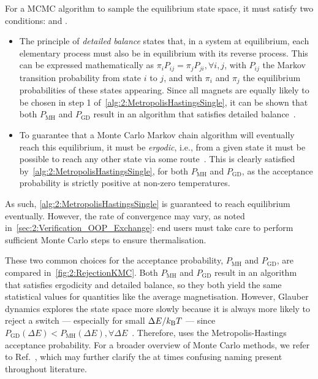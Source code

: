 For a MCMC algorithm to sample the equilibrium state space, it must satisfy two conditions:  and .
\begin{itemize}
	\item The principle of \textit{detailed balance} states that, in a system at equilibrium, each elementary process must also be in equilibrium with its reverse process.
	This can be expressed mathematically as $\pi_i P_{ij} = \pi_j P_{ji}, \forall i,j$, with $P_{ij}$ the Markov transition probability from state $i$ to $j$, and with $\pi_i$ and $\pi_j$ the equilibrium probabilities of these states appearing.
	Since all magnets are equally likely to be chosen in step 1 of~\cref{alg:2:MetropolisHastingsSingle}, it can be shown that both $P_\mathrm{MH}$ and $P_\mathrm{GD}$ result in an algorithm that satisfies detailed balance~\cite{kyimba2006comparisonIsingAlgorithms}.
	\item To guarantee that a Monte Carlo Markov chain algorithm will eventually reach this equilibrium, it must be \textit{ergodic}, i.e., from a given state it must be possible to reach any other state via some route~\cite{kyimba2006comparisonIsingAlgorithms}.
	This is clearly satisfied by~\cref{alg:2:MetropolisHastingsSingle}, for both $P_\mathrm{MH}$ and $P_\mathrm{GD}$, as the acceptance probability is strictly positive at non-zero temperatures.
\end{itemize}
As such, \cref{alg:2:MetropolisHastingsSingle} is guaranteed to reach equilibrium eventually.
However, the rate of convergence may vary, as noted in~\cref{sec:2:Verification_OOP_Exchange}: end users must take care to perform sufficient Monte Carlo steps to ensure thermalisation. %


These two common choices for the acceptance probability, $P_\mathrm{MH}$ and $P_\mathrm{GD}$, are compared in~\cref{fig:2:RejectionKMC}.
Both $P_\mathrm{MH}$ and $P_\mathrm{GD}$ result in an algorithm that satisfies ergodicity and detailed balance, so they both yield the same statistical values for quantities like the average magnetisation.
However, Glauber dynamics explores the state space more slowly because it is always more likely to reject a switch --- especially for small $\Delta E / \kBT$ --- since $P_\mathrm{GD}(\Delta E) < P_\mathrm{MH}(\Delta E), \forall \Delta E$~\cite{jang2004stochastic}.
Therefore, \hotspice uses the Metropolis-Hastings acceptance probability.
For a broader overview of Monte Carlo methods, we refer to Ref.~\cite{IntroductionMC}, which may further clarify the at times confusing naming present throughout literature.

